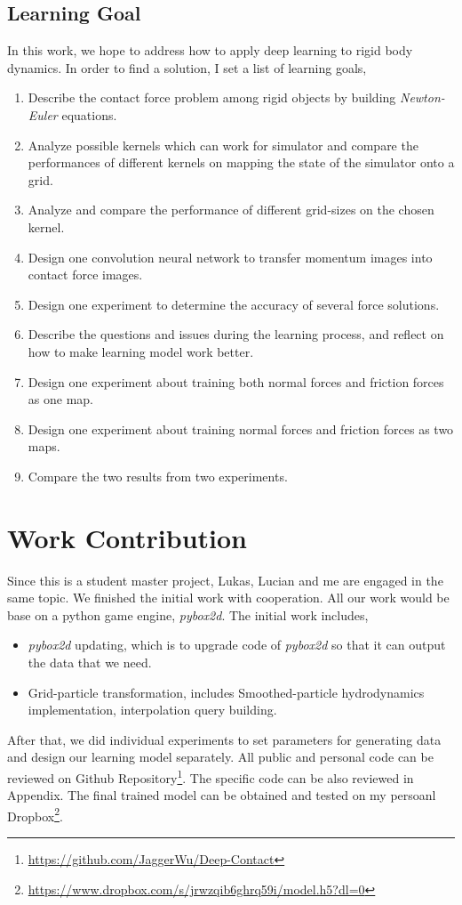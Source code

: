     \subsection{Learning Goal}
    In this work, we hope to address how to apply deep learning to rigid body dynamics. In order to find a solution, I set a list of learning goals, 
    \begin{enumerate}
        \item Describe the contact force problem among rigid objects by building \textit{Newton-Euler} equations.
        \item Analyze possible kernels which can work for simulator and compare the performances of different kernels on mapping the state of the simulator onto a grid.
        \item Analyze and compare the performance of different grid-sizes on the chosen kernel. 
        \item Design one convolution neural network to transfer momentum images into contact force images.
        \item Design one experiment to determine the accuracy of several force solutions.
        \item Describe the questions and issues during the learning process, and reflect on how to make learning model work better.
        \item Design one experiment about training both normal forces and friction forces  as one map.
        \item Design one experiment about training normal forces and friction forces as two maps.
        \item Compare the two results from two experiments.
    \end{enumerate}

\section{Work Contribution}
    Since this is a student master project, Lukas, Lucian and me are engaged in the same topic. We finished the initial work with cooperation. All our work would be base on a python game engine, \textit{pybox2d}. The initial work includes,

    \begin{itemize}
        \item \textit{pybox2d} updating, which is to upgrade code of \textit{pybox2d} so that it can output the data that we need.
        \item Grid-particle transformation, includes Smoothed-particle hydrodynamics implementation, interpolation query building.
    \end{itemize}
    After that, we did individual experiments to set parameters for generating data and design our learning model separately. All public and personal code can be reviewed on Github Repository\footnote{\url{https://github.com/JaggerWu/Deep-Contact}}. The specific code can be also reviewed in Appendix. The final trained model can be obtained and tested on my persoanl Dropbox\footnote{\url{https://www.dropbox.com/s/jrwzqib6ghrq59i/model.h5?dl=0}}.

